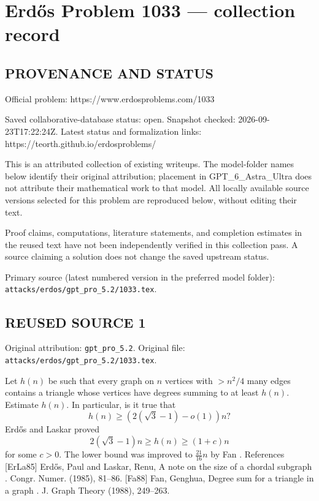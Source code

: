 \section*{Erd\H{o}s Problem 1033 --- collection record}

\subsection*{PROVENANCE AND STATUS}
Official problem: https://www.erdosproblems.com/1033

Saved collaborative-database status: open.
Snapshot checked: 2026-09-23T17:22:24Z.
Latest status and formalization links: https://teorth.github.io/erdosproblems/

This is an attributed collection of existing writeups. The model-folder names below identify their original attribution; placement in GPT\_6\_Astra\_Ultra does not attribute their mathematical work to that model. All locally available source versions selected for this problem are reproduced below, without editing their text.

Proof claims, computations, literature statements, and completion estimates in the reused text have not been independently verified in this collection pass. A source claiming a solution does not change the saved upstream status.

Primary source (latest numbered version in the preferred model folder): \texttt{attacks/erdos/gpt\_pro\_5.2/1033.tex}.

\subsection*{REUSED SOURCE 1}
Original attribution: \texttt{gpt\_pro\_5.2}.
Original file: \texttt{attacks/erdos/gpt\_pro\_5.2/1033.tex}.


Let $h(n)$ be such that every graph on $n$ vertices with $>n^2/4$ many edges contains a triangle whose vertices have degrees summing to at least $h(n)$. Estimate $h(n)$. In particular, is it true that\[h(n)\geq (2(\sqrt{3}-1)-o(1))n?\] Erd\H{o}s and Laskar \cite{ErLa85} proved\[2(\sqrt{3}-1)n \geq h(n) \geq (1+c)n\]for some $c>0$. The lower bound was improved to $\frac{21}{16}n$ by Fan \cite{Fa88}. References [ErLa85] Erd\H{o}s, Paul and Laskar, Renu, A note on the size of a chordal subgraph . Congr. Numer. (1985), 81--86. [Fa88] Fan, Genghua, Degree sum for a triangle in a graph . J. Graph Theory (1988), 249--263.

